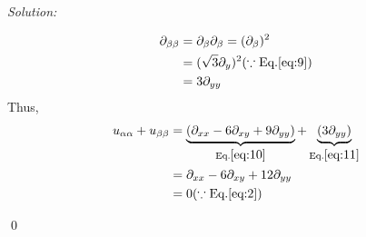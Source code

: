 \documentclass[12pt]{article}
\newenvironment{problem}[2][Problem]{\begin{trivlist}
\item[\hskip \labelsep {\bfseries #1}\hskip \labelsep {\bfseries #2.}]}{\end{trivlist}}
\newenvironment{sol}
{\emph{Solution:}
}
{
    \qed
    }
\begin{document}
\begin{sol}
\begin{align}
        \partial_{\beta\beta} & = \partial_{\beta} \partial_{\beta} = (\partial_{\beta})^2 \nonumber \\
        & = (\sqrt{3}\partial_{y})^2 (\because \textrm{Eq.} \eqref{eq:9}) \nonumber \\
        & = 3 \partial_{yy} \label{eq:11}
    \end{align}
    Thus,
    \begin{align}
        u_{\alpha\alpha} + u_{\beta\beta} & = \underbrace{(\partial_{xx} -6 \partial_{xy} + 9 \partial_{yy})}_{\textrm{Eq.} \eqref{eq:10}} + \underbrace{(3\partial_{yy})}_{\textrm{Eq.} \eqref{eq:11}} \nonumber \\
        & = \partial_{xx} - 6 \partial_{xy} + 12\partial_{yy} \nonumber \\
        & = 0 \nonumber (\because \textrm{Eq.} \eqref{eq:2}) \nonumber
    \end{align}
\end{sol}








\end{document}
